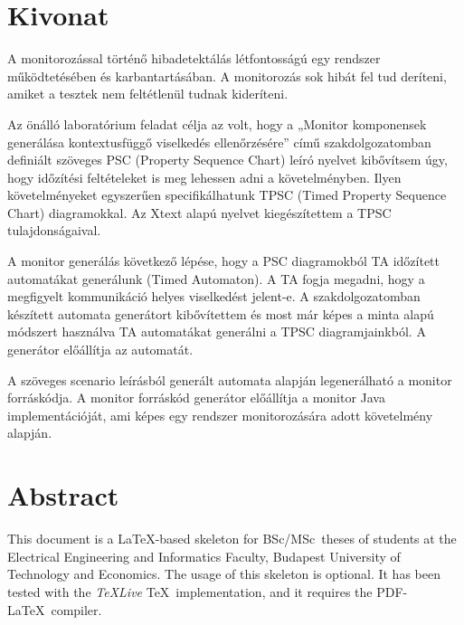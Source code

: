 \setcounter{page}{1}

\selecthungarian

\chapter*{Kivonat}

A monitorozással történő hibadetektálás létfontosságú egy rendszer működtetésében és karbantartásában. A monitorozás sok hibát fel tud deríteni, amiket a tesztek nem feltétlenül tudnak kideríteni.

Az önálló laboratórium feladat célja az volt, hogy a „Monitor komponensek generálása kontextusfüggő viselkedés ellenőrzésére” című szakdolgozatomban definiált szöveges PSC (Property Sequence Chart) leíró nyelvet kibővítsem úgy, hogy időzítési feltételeket is meg lehessen adni a követelményben. Ilyen követelményeket egyszerűen specifikálhatunk TPSC (Timed Property Sequence Chart) diagramokkal. Az Xtext alapú nyelvet kiegészítettem a TPSC tulajdonságaival.

A monitor generálás következő lépése, hogy a PSC diagramokból TA időzített automatákat generálunk (Timed Automaton). A TA fogja megadni, hogy a megfigyelt kommunikáció helyes viselkedést jelent-e. A szakdolgozatomban készített automata generátort kibővítettem és most már képes a minta alapú módszert használva TA automatákat generálni a TPSC diagramjainkból. A generátor előállítja az automatát.

A szöveges scenario leírásból generált automata alapján legenerálható a monitor forráskódja. A monitor forráskód generátor előállítja a monitor Java implementációját, ami képes egy rendszer monitorozására adott követelmény alapján.



\vfill
\selectenglish


\chapter*{Abstract}

This document is a \LaTeX-based skeleton for BSc/MSc~theses of students at the Electrical Engineering and Informatics Faculty, Budapest University of Technology and Economics. The usage of this skeleton is optional. It has been tested with the \emph{TeXLive} \TeX~implementation, and it requires the PDF-\LaTeX~compiler.


\vfill
\selectthesislanguage

\setcounter{romanPage}{\value{page}}
